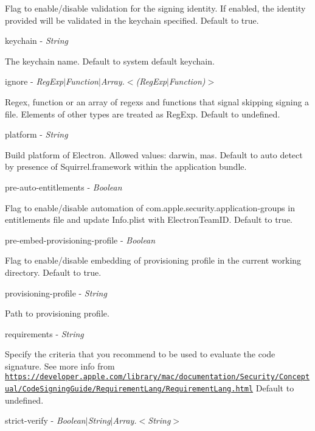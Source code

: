 Flag to enable/disable validation for the signing identity. If enabled, the {\ttfamily identity} provided will be validated in the {\ttfamily keychain} specified. Default to {\ttfamily true}.

{\ttfamily keychain} -\/ {\itshape String}

The keychain name. Default to system default keychain.

{\ttfamily ignore} -\/ {\itshape Reg\+Exp$\vert$\+Function$\vert$\+Array.$<$(Reg\+Exp$\vert$\+Function)$>$}

Regex, function or an array of regex\textquotesingle{}s and functions that signal skipping signing a file. Elements of other types are treated as {\ttfamily Reg\+Exp}. Default to {\ttfamily undefined}.

{\ttfamily platform} -\/ {\itshape String}

Build platform of Electron. Allowed values\+: {\ttfamily darwin}, {\ttfamily mas}. Default to auto detect by presence of {\ttfamily Squirrel.\+framework} within the application bundle.

{\ttfamily pre-\/auto-\/entitlements} -\/ {\itshape Boolean}

Flag to enable/disable automation of {\ttfamily com.\+apple.\+security.\+application-\/groups} in entitlements file and update {\ttfamily Info.\+plist} with {\ttfamily Electron\+Team\+ID}. Default to {\ttfamily true}.

{\ttfamily pre-\/embed-\/provisioning-\/profile} -\/ {\itshape Boolean}

Flag to enable/disable embedding of provisioning profile in the current working directory. Default to {\ttfamily true}.

{\ttfamily provisioning-\/profile} -\/ {\itshape String}

Path to provisioning profile.

{\ttfamily requirements} -\/ {\itshape String}

Specify the criteria that you recommend to be used to evaluate the code signature. See more info from \href{https://developer.apple.com/library/mac/documentation/Security/Conceptual/CodeSigningGuide/RequirementLang/RequirementLang.html}{\tt https\+://developer.\+apple.\+com/library/mac/documentation/\+Security/\+Conceptual/\+Code\+Signing\+Guide/\+Requirement\+Lang/\+Requirement\+Lang.\+html} Default to {\ttfamily undefined}.

{\ttfamily strict-\/verify} -\/ {\itshape Boolean$\vert$\+String$\vert$\+Array.$<$\+String$>$}

